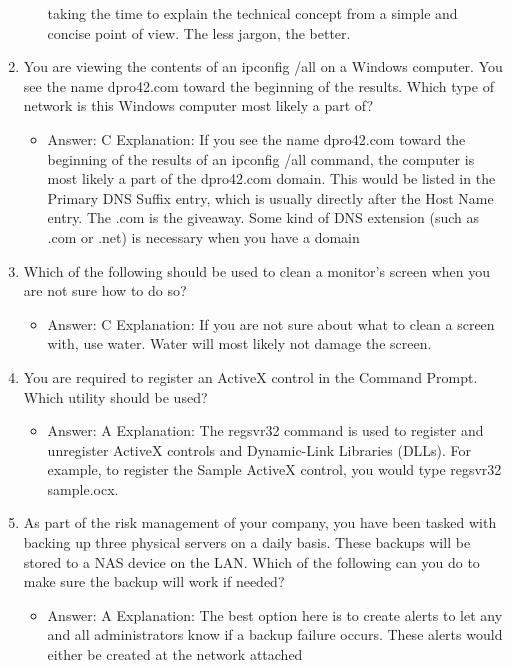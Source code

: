 \documentclass{article}
\begin{document}
\begin{enumerate}
\begin{itemize}
taking the time to explain the technical concept from a simple and concise point of
view. The less jargon, the better.
    \end{itemize}
    \item You are viewing the contents of an ipconfig /all on a
Windows computer. You see the name dpro42.com toward the
beginning of the results. Which type of network is this Windows
computer most likely a part of?
    \begin{itemize}
        \item Answer: C
Explanation: If you see the name dpro42.com toward the beginning of the results of
an ipconfig /all command, the computer is most likely a part of the dpro42.com
domain. This would be listed in the Primary DNS Suffix entry, which is usually directly
after the Host Name entry. The .com is the giveaway. Some kind of DNS extension
(such as .com or .net) is necessary when you have a domain
    \end{itemize}
    \item Which of the following should be used to clean a monitor’s screen
when you are not sure how to do so?
    \begin{itemize}
        \item Answer: C
Explanation: If you are not sure about what to clean a screen with, use water. Water
will most likely not damage the screen.
    \end{itemize}
    \item You are required to register an ActiveX control in the Command
Prompt. Which utility should be used?
    \begin{itemize}
        \item Answer: A
Explanation: The regsvr32 command is used to register and unregister ActiveX controls
and Dynamic-Link Libraries (DLLs). For example, to register the Sample ActiveX
control, you would type regsvr32 sample.ocx.
    \end{itemize}
    \item As part of the risk management of your company, you have been
tasked with backing up three physical servers on a daily basis.
These backups will be stored to a NAS device on the LAN. Which
of the following can you do to make sure the backup will work if
needed?
    \begin{itemize}
        \item Answer: A
Explanation: The best option here is to create alerts to let any and all administrators
know if a backup failure occurs. These alerts would either be created at the network attached

\end{itemize}
\end{enumerate}
\end{document}
